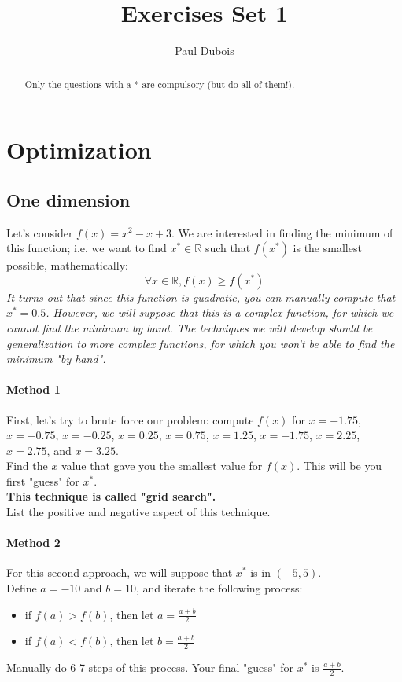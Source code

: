 \documentclass[]{article}
\title{Exercises Set 1}
\author{Paul Dubois}
\newcommand{\R}{\mathbb{R}}
\begin{document}
	
	\maketitle
	
	\begin{abstract}
		Only the questions with a * are compulsory (but do all of them!).
	\end{abstract}
	
	\section{Optimization}
	\subsection{One dimension}
	Let's consider $f(x) = x^2-x+3$.
	We are interested in finding the minimum of this function; 
	i.e. we want to find $x^* \in \R$ such that $f(x^*)$ is the smallest possible, mathematically:
	$$\forall x\in \R, f(x) \geq f(x^*)$$
	\textit{It turns out that since this function is quadratic, you can manually compute that $x^*=0.5$.
		However, we will suppose that this is a complex function, for which we cannot find the minimum by hand.
		The techniques we will develop should be generalization to more complex functions, for which you won't be able to find the minimum "by hand".}
	
	\paragraph{Method 1}
	First, let's try to brute force our problem: compute $f(x)$ for $x=-1.75$, $x=-0.75$, $x=-0.25$, $x=0.25$, $x=0.75$, $x=1.25$, $x=-1.75$, $x=2.25$, $x=2.75$, and $x=3.25$.\\
	Find the $x$ value that gave you the smallest value for $f(x)$.
	This will be you first "guess" for $x^*$.\\
	\textbf{This technique is called "grid search".}\\
	List the positive and negative aspect of this technique.
	
	\paragraph{Method 2}
	For this second approach, we will suppose that $x^*$ is in $(-5,5)$.\\
	Define $a=-10$ and $b=10$, and iterate the following process:
	\begin{itemize}
		\item if $f(a)>f(b)$, then let $a = \frac{a+b}{2}$
		\item if $f(a)<f(b)$, then let $b = \frac{a+b}{2}$
	\end{itemize}
	Manually do 6-7 steps of this process.
	Your final "guess" for $x^*$ is $\frac{a+b}{2}$.
	
	
	
	
	
	
	
\end{document}
